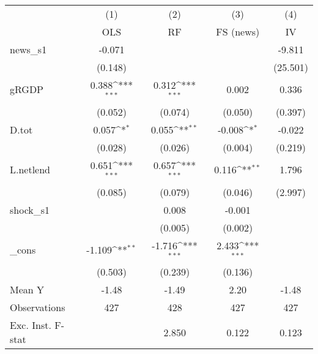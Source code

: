 {
\def\sym#1{\ifmmode^{#1}\else\(^{#1}\)\fi}
\begin{tabular}{l*{4}{c}}
\toprule
            &\multicolumn{1}{c}{(1)}&\multicolumn{1}{c}{(2)}&\multicolumn{1}{c}{(3)}&\multicolumn{1}{c}{(4)}\\
            &\multicolumn{1}{c}{OLS}&\multicolumn{1}{c}{RF}&\multicolumn{1}{c}{FS (news)}&\multicolumn{1}{c}{IV}\\
\midrule
news\_s1     &      -0.071         &                     &                     &      -9.811         \\
            &     (0.148)         &                     &                     &    (25.501)         \\
\addlinespace
gRGDP       &       0.388\sym{***}&       0.312\sym{***}&       0.002         &       0.336         \\
            &     (0.052)         &     (0.074)         &     (0.050)         &     (0.397)         \\
\addlinespace
D.tot       &       0.057\sym{*}  &       0.055\sym{**} &      -0.008\sym{*}  &      -0.022         \\
            &     (0.028)         &     (0.026)         &     (0.004)         &     (0.219)         \\
\addlinespace
L.netlend   &       0.651\sym{***}&       0.657\sym{***}&       0.116\sym{**} &       1.796         \\
            &     (0.085)         &     (0.079)         &     (0.046)         &     (2.997)         \\
\addlinespace
shock\_s1    &                     &       0.008         &      -0.001         &                     \\
            &                     &     (0.005)         &     (0.002)         &                     \\
\addlinespace
\_cons      &      -1.109\sym{**} &      -1.716\sym{***}&       2.433\sym{***}&                     \\
            &     (0.503)         &     (0.239)         &     (0.136)         &                     \\
\midrule
Mean Y      &       -1.48         &       -1.49         &        2.20         &       -1.48         \\
Observations&         427         &         428         &         427         &         427         \\
Exc. Inst. F-stat&                     &       2.850         &       0.122         &       0.123         \\
\bottomrule
\end{tabular}
}

